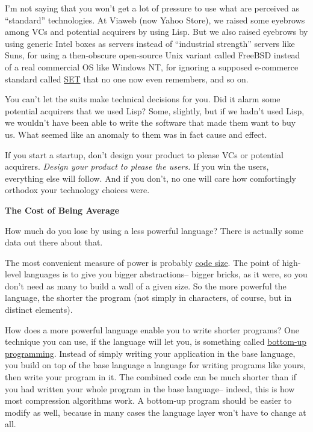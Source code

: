 \documentclass[12pt]{book}
\begin{document}
I'm not saying that you won't get a lot of pressure to use what are
perceived as ``standard'' technologies. At Viaweb (now Yahoo Store), we
raised some eyebrows among VCs and potential acquirers by using Lisp.
But we also raised eyebrows by using generic Intel boxes as servers
instead of ``industrial strength'' servers like Suns, for using a
then-obscure open-source Unix variant called FreeBSD instead of a real
commercial OS like Windows NT, for ignoring a supposed e-commerce
standard called \href{http://news.com.com/2100-1017-225723.html}{SET}
that no one now even remembers, and so on.

You can't let the suits make technical decisions for you. Did it alarm
some potential acquirers that we used Lisp? Some, slightly, but if we
hadn't used Lisp, we wouldn't have been able to write the software that
made them want to buy us. What seemed like an anomaly to them was in
fact cause and effect.

If you start a startup, don't design your product to please VCs or
potential acquirers. \emph{Design your product to please the users.} If
you win the users, everything else will follow. And if you don't, no one
will care how comfortingly orthodox your technology choices were.

\textbf{The Cost of Being Average}

How much do you lose by using a less powerful language? There is
actually some data out there about that.

The most convenient measure of power is probably \href{power.html}{code
size}. The point of high-level languages is to give you bigger
abstractions-- bigger bricks, as it were, so you don't need as many to
build a wall of a given size. So the more powerful the language, the
shorter the program (not simply in characters, of course, but in
distinct elements).

How does a more powerful language enable you to write shorter programs?
One technique you can use, if the language will let you, is something
called \href{progbot.html}{bottom-up programming}. Instead of simply
writing your application in the base language, you build on top of the
base language a language for writing programs like yours, then write
your program in it. The combined code can be much shorter than if you
had written your whole program in the base language-- indeed, this is
how most compression algorithms work. A bottom-up program should be
easier to modify as well, because in many cases the language layer won't
have to change at all.
\end{document}

